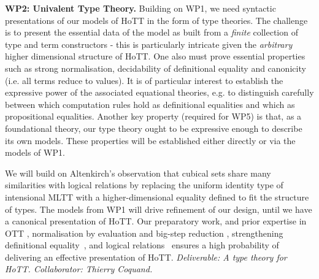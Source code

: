 \documentclass[a4paper,11pt]{article}
\begin{document}

{\bf WP2: Univalent Type Theory.} Building on WP1, we need syntactic
presentations of our models of HoTT in the form of type theories. The
challenge is to present the essential data of the model as built from
a {\em finite} collection of type and term constructors - this is
particularly intricate given the {\em arbitrary} higher dimensional
structure of HoTT. One also must prove essential properties such as strong normalisation, decidability of
definitional equality and canonicity (i.e. all terms reduce to
values). It is of particular interest to establish the expressive
power of the associated equational theories, e.g. to distinguish
carefully between which computation rules hold as definitional
equalities and which as propositional equalities. Another key property
(required for WP5) is that, as a foundational theory, our type theory
ought to be expressive enough to describe its own models. These
properties will be established either directly or via the models of
WP1.





We will build on Altenkirch's observation \cite{txa-ihp14} that cubical sets share
many similarities with logical relations by replacing the uniform
identity type of intensional MLTT with a higher-dimensional equality
defined to fit the structure of types. The models from WP1 will drive
refinement of our design, until we have a canonical presentation of
HoTT. Our preparatory work, and prior expertise in OTT
\cite{alti:ott-conf}, normalisation by evaluation and big-step
reduction \cite{alti:ctcs95,alti:lics96,alti:flops04,txa:jtait},
strengthening definitional
equality~\cite{Allais:2013:NEN:2502409.2502411}, and logical
relations~\cite{neil2014relParamDep} ensures a high probability of
delivering an effective presentation of HoTT.  {\em Deliverable: A
  type theory for HoTT. Collaborator: Thierry Coquand.}

\end{document}
